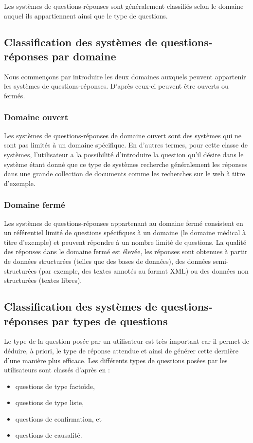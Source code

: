 Les systèmes de questions-réponses sont généralement classifiés selon le domaine auquel ils appartiennent ainsi que le type de questions.

\subsection{Classification des systèmes de questions-réponses par domaine} \label{QASdomain}
Nous commençons par introduire les deux domaines auxquels peuvent appartenir les systèmes de questions-réponses. D'après \cite{Types_QAS_Survey} ceux-ci peuvent être ouverts ou fermés.
\subsubsection{Domaine ouvert}
Les systèmes de questions-réponses de domaine ouvert sont des systèmes qui ne sont pas limités à un domaine spécifique. En d'autres termes, pour cette classe de systèmes, l'utilisateur a la possibilité d'introduire la question qu'il désire dans le système étant donné que ce type de systèmes recherche généralement les réponses dans une grande collection de documents comme les recherches sur le web à titre d'exemple.

\subsubsection{Domaine fermé}
Les systèmes de questions-réponses appartenant au domaine fermé consistent en un référentiel limité de questions spécifiques à un domaine (le domaine médical à titre d'exemple) et peuvent répondre à un nombre limité de questions. La qualité des réponses dans le domaine fermé est élevée, les réponses sont obtenues à partir de données structurées (telles que des bases de données), des données semi-structurées (par exemple, des textes annotés au format XML) ou des données non structurées (textes libres).
\subsection{Classification des systèmes de questions-réponses par types de questions} \label{QASqstType} 
Le type de la question posée par un utilisateur est très important car il permet de déduire, à priori, le type de réponse attendue et ainsi de générer cette dernière d'une manière plus efficace. 
Les différents types de questions posées par les utilisateurs sont classés d'après \cite{qstClassif} en :
\begin{itemize}
    \item questions de type factoïde, 
    \item questions de type liste,
    \item questions de confirmation, et 
    \item questions de causalité.\\
\end{itemize}

